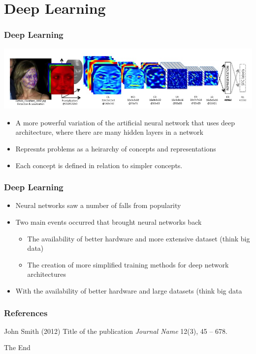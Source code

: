 \documentclass{beamer}
\begin{document}
\section{Deep Learning}
\begin{frame}
    \frametitle{Deep Learning}
    \begin{center}
        \includegraphics[scale=.34]{deepfaces}
    \end{center}
    \begin{itemize}

        \item A more powerful variation of the artificial neural network that uses deep architecture, where there are many hidden layers in a network
        \item Represnts problems as a heirarchy of concepts and representations
        \item Each concept is defined in relation to simpler concepts.
    \end{itemize}
\end{frame}
\begin{frame}
    \frametitle{Deep Learning}
    \begin{itemize}
        \item Neural networks saw a number of falls from popularity
        \item Two main events occurred that brought neural networks back
        \begin{itemize}
            \item The availability of better hardware and more extensive dataset (think big data)
            \item The creation of more simplified training methods for deep network architectures
        \end{itemize}
        \item With the availability of better hardware and large datasets (think big data
    \end{itemize}
\end{frame}

\begin{frame}
\frametitle{References}
\footnotesize{
\begin{thebibliography}{99} %
 John Smith (2012)
\newblock Title of the publication
\newblock \emph{Journal Name} 12(3), 45 -- 678.
\end{thebibliography}
}
\end{frame}


\begin{frame}
\Huge{\centerline{The End}}
\end{frame}

\end{document}
